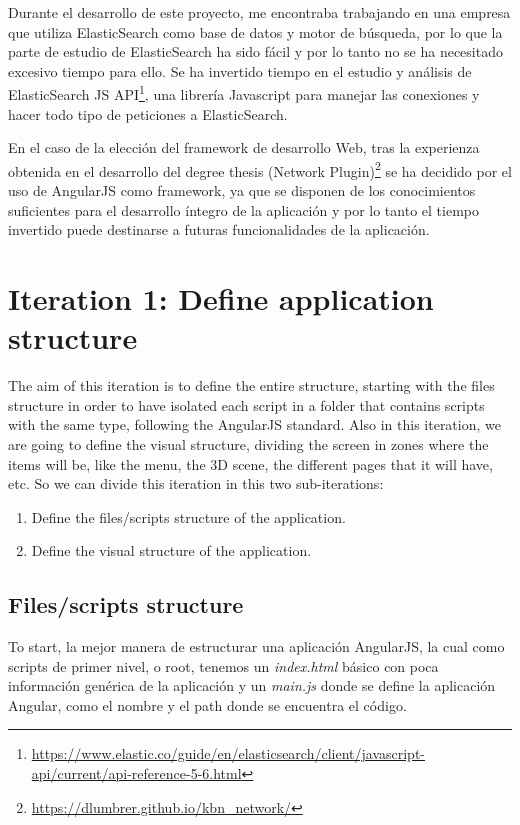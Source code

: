 \documentclass[a4paper, 12pt]{book}
\begin{document}
Durante el desarrollo de este proyecto, me encontraba trabajando en una empresa que utiliza ElasticSearch como base de datos y motor de búsqueda, por lo que la parte de estudio de ElasticSearch ha sido fácil y por lo tanto no se ha necesitado excesivo tiempo para ello. Se ha invertido tiempo en el estudio y análisis de ElasticSearch JS API\footnote{\url{https://www.elastic.co/guide/en/elasticsearch/client/javascript-api/current/api-reference-5-6.html}}, una librería Javascript para manejar las conexiones y hacer todo tipo de peticiones a ElasticSearch.

En el caso de la elección del framework de desarrollo Web, tras la experienza obtenida en el desarrollo del degree thesis (Network Plugin)\footnote{\url{https://dlumbrer.github.io/kbn_network/}} se ha decidido por el uso de AngularJS como framework, ya que se disponen de los conocimientos suficientes para el desarrollo íntegro de la aplicación y por lo tanto el tiempo invertido puede destinarse a futuras funcionalidades de la aplicación.

\section{Iteration 1: Define application structure}
\label{sec:it1}

The aim of this iteration is to define the entire structure, starting with the files structure in order to have isolated each script in a folder that contains scripts with the same type, following the AngularJS standard. Also in this iteration, we are going to define the visual structure, dividing the screen in zones where the items will be, like the menu, the 3D scene, the different pages that it will have, etc.
So we can divide this iteration in this two sub-iterations:

\begin{enumerate}
\item Define the files/scripts structure of the application.
\item Define the visual structure of the application.
\end{enumerate}

\subsection{Files/scripts structure}

To start, la mejor manera de estructurar una aplicación AngularJS, la cual como scripts de primer nivel, o root, tenemos un \textit{index.html} básico con poca información genérica de la aplicación y un \textit{main.js} donde se define la aplicación Angular, como el nombre y el path donde se encuentra el código.
\end{document}

